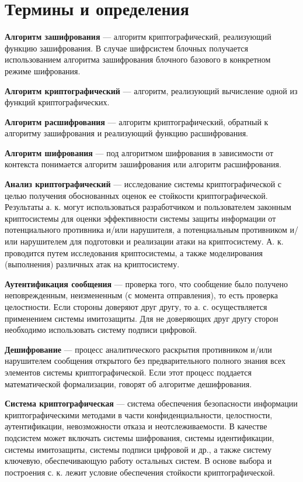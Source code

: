 \section{Термины и определения}

\textbf{Алгоритм зашифрования} — алгоритм криптографический, реализующий функцию зашифрования. В случае шифрсистем блочных получается использованием алгоритма зашифрования блочного базового в конкретном режиме шифрования.

\textbf{Алгоритм криптографический} — алгоритм, реализующий вычисление одной из функций криптографических.

\textbf{Алгоритм расшифрования} — алгоритм криптографический, обратный к алгоритму зашифрования и реализующий функцию расшифрования.

\textbf{Алгоритм шифрования} — под алгоритмом шифрования в зависимости от контекста понимается алгоритм зашифрования или алгоритм расшифрования.

\textbf{Анализ криптографический} — исследование системы криптографической с целью получения обоснованных оценок ее стойкости криптографической. Результаты а. к. могут использоваться разработчиком и пользователем законным криптосистемы для оценки эффективности системы защиты информации от потенциального противника и/или нарушителя, а потенциальным противником и/или нарушителем для подготовки и реализации атаки на криптосистему. А. к. проводится путем исследования криптосистемы, а также моделирования (выполнения) различных атак на криптосистему.

\textbf{Аутентификация сообщения} — проверка того, что сообщение было получено неповрежденным, неизмененным (с момента отправления), то есть проверка целостности. Если стороны доверяют друг другу, то а. с. осуществляется применением системы имитозащиты. Для не доверяющих друг другу сторон необходимо использовать систему подписи цифровой.

\textbf {Дешифрование} — процесс аналитического раскрытия противником и/или нарушителем сообщения открытого без предварительного полного знания всех элементов системы криптографической. Если этот процесс поддается математической формализации, говорят об алгоритме дешифрования.

\textbf{Система криптографическая} — система обеспечения безопасности информации криптографическими методами в части конфиденциальности, целостности, аутентификации, невозможности отказа и неотслеживаемости. В качестве подсистем может включать системы шифрования, системы идентификации, системы имитозащиты, системы подписи цифровой и др., а также систему ключевую, обеспечивающую работу остальных систем. В основе выбора и построения с. к. лежит условие обеспечения стойкости криптографической.

